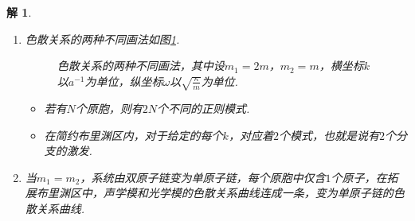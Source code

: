 \documentclass[UTF8,10pt,a4paper]{article}
\theoremstyle{Problem}
\theoremstyle{Solution}
\newtheorem*{sol}{解}
\begin{document}
\begin{sol}
\begin{enumerate}
\begin{itemize}
\begin{align}
                \beta=-\frac{1}{L}\frac{\partial L}{\partial F}=-\frac{1}{Na}\left(\frac{\partial F}{\partial Na}\right)^{-1}=-\frac{1}{a}\left(\frac{\partial F}{\partial a}\right)^{-1}=\frac{2}{a\kappa}.
            \end{align}
            故声速可以由下式得到
            \begin{align}
                v_s=\sqrt{\beta^{-1}/\rho}=a\sqrt{\frac{\kappa}{2(m_1+m_2)}}.
            \end{align}
        \end{itemize}
        \item[(d)] 色散关系的两种不同画法如图\ref{1-omega-k}.
        \begin{figure}[h]
            \centering
            \caption{色散关系的两种不同画法，其中设$m_1=2m$，$m_2=m$，横坐标$k$以$a^{-1}$为单位，纵坐标$\omega$以$\sqrt{\frac{\kappa}{m}}$为单位.}
            \label{1-omega-k}
        \end{figure}
        \begin{itemize}
            \item[$\triangleright$] 若有$N$个原胞，则有$2N$个不同的正则模式.
            \item[$\triangleright$] 在简约布里渊区内，对于给定的每个$k$，对应着$2$个模式，也就是说有$2$个分支的激发.
        \end{itemize}
        \item[(e)] 当$m_1=m_2$，系统由双原子链变为单原子链，每个原胞中仅含$1$个原子，在拓展布里渊区中，声学模和光学模的色散关系曲线连成一条，变为单原子链的色散关系曲线.
    \end{enumerate}
\end{sol}
\end{document}
